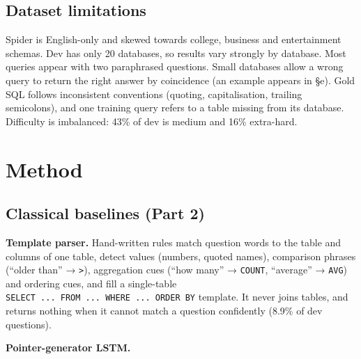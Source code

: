 \documentclass[
  10pt,
]{article}
\begin{document}
\subsection{Dataset limitations}\label{dataset-limitations}

Spider is English-only and skewed towards college, business and
entertainment schemas. Dev has only 20 databases, so results vary
strongly by database. Most queries appear with two paraphrased
questions. Small databases allow a wrong query to return the right
answer by coincidence (an example appears in §e). Gold SQL follows
inconsistent conventions (quoting, capitalisation, trailing semicolons),
and one training query refers to a table missing from its database.
Difficulty is imbalanced: 43\% of dev is medium and 16\% extra-hard.

\section{Method}\label{method}

\subsection{Classical baselines (Part
2)}\label{classical-baselines-part-2}

\textbf{Template parser.} Hand-written rules match question words to the
table and columns of one table, detect values (numbers, quoted names),
comparison phrases (``older than'' → \texttt{\textgreater{}}),
aggregation cues (``how many'' → \texttt{COUNT}, ``average'' →
\texttt{AVG}) and ordering cues, and fill a single-table
\texttt{SELECT\ ...\ FROM\ ...\ WHERE\ ...\ ORDER\ BY} template. It
never joins tables, and returns nothing when it cannot match a question
confidently (8.9\% of dev questions).

\textbf{Pointer-generator LSTM.}
\end{document}
